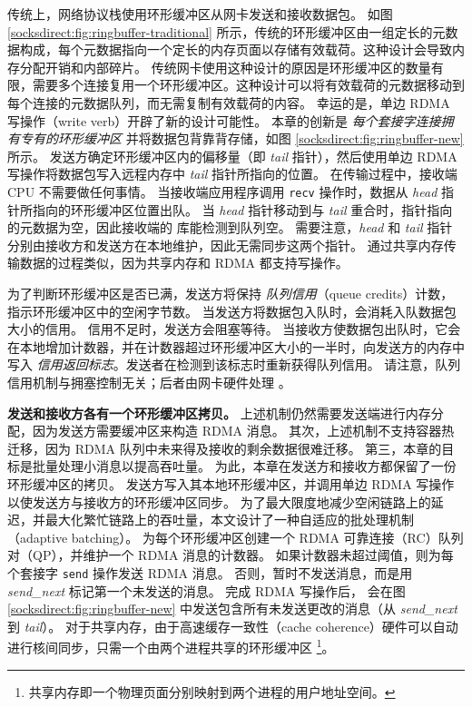 传统上，网络协议栈使用环形缓冲区从网卡发送和接收数据包。
如图 \ref {socksdirect:fig:ringbuffer-traditional} 所示，传统的环形缓冲区由一组定长的元数据构成，每个元数据指向一个定长的内存页面以存储有效载荷。这种设计会导致内存分配开销和内部碎片。
传统网卡使用这种设计的原因是环形缓冲区的数量有限，需要多个连接复用一个环形缓冲区。这种设计可以将有效载荷的元数据移动到每个连接的元数据队列，而无需复制有效载荷的内容。
幸运的是，单边 RDMA 写操作（write verb）开辟了新的设计可能性。
本章的创新是 \emph {每个套接字连接拥有专有的环形缓冲区} 并将数据包背靠背存储，如图 \ref {socksdirect:fig:ringbuffer-new} 所示。
发送方确定环形缓冲区内的偏移量（即 \emph{tail} 指针），然后使用单边 RDMA 写操作将数据包写入远程内存中 \emph{tail} 指针所指向的位置。
在传输过程中，接收端 CPU 不需要做任何事情。
当接收端应用程序调用 \texttt {recv} 操作时，数据从 \emph {head} 指针所指向的环形缓冲区位置出队。
当 \emph{head} 指针移动到与 \emph{tail} 重合时，指针指向的元数据为空，因此接收端的 \libipc{} 库能检测到队列空。
需要注意，\emph{head} 和 \emph{tail} 指针分别由接收方和发送方在本地维护，因此无需同步这两个指针。
通过共享内存传输数据的过程类似，因为共享内存和 RDMA 都支持写操作。



为了判断环形缓冲区是否已满，发送方将保持 \textit {队列信用}（queue credits）计数，指示环形缓冲区中的空闲字节数。
当发送方将数据包入队时，会消耗入队数据包大小的信用。
信用不足时，发送方会阻塞等待。
当接收方使数据包出队时，它会在本地增加计数器，并在计数器超过环形缓冲区大小的一半时，向发送方的内存中写入 \textit {信用返回标志}。发送者在检测到该标志时重新获得队列信用。
请注意，队列信用机制与拥塞控制无关；后者由网卡硬件处理 \cite {zhu2015congestion}。

\textbf {发送和接收方各有一个环形缓冲区拷贝。}
上述机制仍然需要发送端进行内存分配，因为发送方需要缓冲区来构造 RDMA 消息。
其次，上述机制不支持容器热迁移，因为 RDMA 队列中未来得及接收的剩余数据很难迁移。
第三，本章的目标是批量处理小消息以提高吞吐量。
为此，本章在发送方和接收方都保留了一份环形缓冲区的拷贝。
发送方写入其本地环形缓冲区，并调用单边 RDMA 写操作以使发送方与接收方的环形缓冲区同步。
为了最大限度地减少空闲链路上的延迟，并最大化繁忙链路上的吞吐量，本文设计了一种自适应的批处理机制（adaptive batching）。
\libipc{} 为每个环形缓冲区创建一个 RDMA 可靠连接（RC）队列对（QP），并维护一个 RDMA 消息的计数器。
如果计数器未超过阈值，则为每个套接字 \texttt {send} 操作发送 RDMA 消息。
否则，暂时不发送消息，而是用 \emph {send\_next} 标记第一个未发送的消息。
完成 RDMA 写操作后，\libipc{} 会在图 \ref {socksdirect:fig:ringbuffer-new} 中发送包含所有未发送更改的消息（从 \emph {send\_next} 到 \emph {tail}）。
对于共享内存，由于高速缓存一致性（cache coherence）硬件可以自动进行核间同步，只需一个由两个进程共享的环形缓冲区 \footnote{共享内存即一个物理页面分别映射到两个进程的用户地址空间。}。

